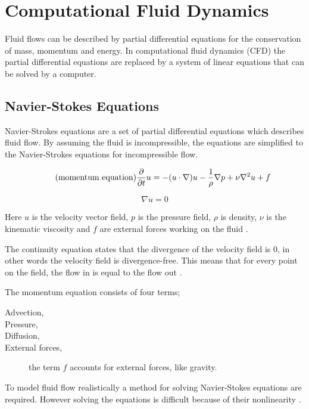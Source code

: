 \section{Computational Fluid Dynamics}

Fluid flows can be described by partial differential equations for the conservation 
of mass, momentum and energy. In computational fluid dynamics (CFD) the partial 
differential equations are replaced by a system of linear equations that can be 
solved by a computer. 

\subsection{Navier-Stokes Equations}

Navier-Strokes equations are a set of partial differential equations which describes 
fluid flow\cite{fluidDynamicsIntro}. By assuming the fluid is incompressible, 
the equations are simplified to the Navier-Strokes equations for incompressible 
flow\cite{originalSnowThesis}. 

\begin{equation} 
	\tag{momentum equation}
	\frac{\partial}{\partial t}u  = -(u \cdot \nabla)u - \frac{1}{\rho}\nabla p + \nu \nabla^2 u + f
\end{equation}

\begin{equation}
	\tag{continuity equation}
	\nabla u = 0
\end{equation}

Here $u$ is the velocity vector field, $p$ is the pressure field, $\rho$ is density,
$\nu$ is the kinematic viscosity and $f$ are external forces working on the fluid
\cite{gpuSnowThesis}. 

The continuity equation states that the divergence of the 
velocity field is 0, in other words the velocity field is divergence-free. This 
means that for every point on the field, the flow in is equal to the flow out
\cite{originalSnowThesis}. 

The momentum equation consists of four terms;
\begin{description}
	\item[Advection,] 
	\item[Pressure,]
	\item[Diffusion,]
	\item[External forces,] the term $f$ accounts for external forces, like gravity.
\end{description}

To model fluid flow realistically a method for solving Navier-Stokes equations are 
required. However solving the equations is difficult because of their nonlinearity
\cite{smokeAndFire}. 

